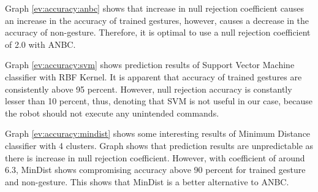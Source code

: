

Graph \ref{ev:accuracy:anbc} shows that increase in null rejection coefficient causes an increase in the accuracy of trained gestures, however, causes a decrease in the accuracy of non-gesture. Therefore, it is optimal to use a null rejection coefficient of 2.0 with ANBC.

Graph \ref{ev:accuracy:svm} shows prediction results of Support Vector Machine classifier with RBF Kernel. It is apparent that accuracy of trained gestures are consistently above 95 percent. However, null rejection accuracy is constantly lesser than 10 percent, thus, denoting that SVM is not useful in our case, because the robot should not execute any unintended commands.

Graph \ref{ev:accuracy:mindist} shows some interesting results of Minimum Distance classifier with 4 clusters. Graph shows that prediction results are unpredictable as there is increase in null rejection coefficient. However, with coefficient of around 6.3, MinDist shows compromising accuracy above 90 percent for trained gesture and non-gesture. This shows that MinDist is a better alternative to ANBC. 